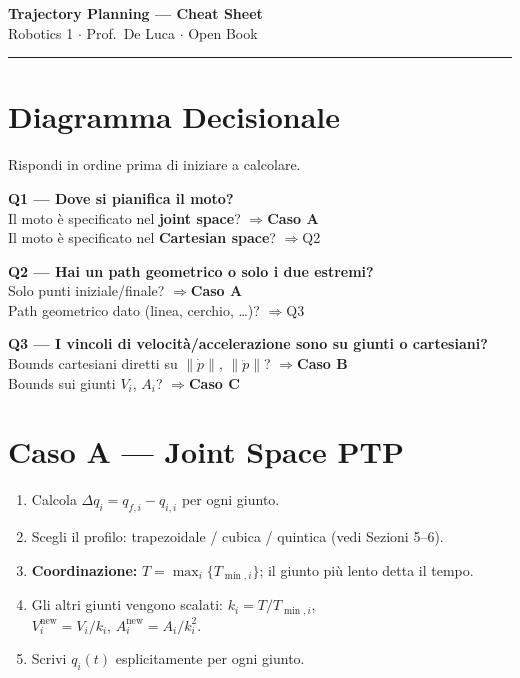 \documentclass[10pt,a4paper]{article}
\begin{document}
{\centering
  {\Large\bfseries Trajectory Planning --- Cheat Sheet}\\[3pt]
  {\normalsize Robotics 1 $\cdot$ Prof.\ De Luca $\cdot$ Open Book}\\[2pt]
  \hrule
  \vspace{6pt}
}

\section{Diagramma Decisionale}

Rispondi in ordine prima di iniziare a calcolare.

\begin{amberbox}
\textbf{Q1 --- Dove si pianifica il moto?}\\
Il moto \`e specificato nel \textbf{joint space}? \quad$\Rightarrow$\quad \textbf{Caso A}\\
Il moto \`e specificato nel \textbf{Cartesian space}? \quad$\Rightarrow$\quad Q2

\medskip
\textbf{Q2 --- Hai un path geometrico o solo i due estremi?}\\
Solo punti iniziale/finale? \quad$\Rightarrow$\quad \textbf{Caso A}\\
Path geometrico dato (linea, cerchio, \ldots)? \quad$\Rightarrow$\quad Q3

\medskip
\textbf{Q3 --- I vincoli di velocit\`a/accelerazione sono su giunti o cartesiani?}\\
Bounds cartesiani diretti su $\|\dot{p}\|$, $\|\ddot{p}\|$? \quad$\Rightarrow$\quad \textbf{Caso B}\\
Bounds sui giunti $V_i$, $A_i$? \quad$\Rightarrow$\quad \textbf{Caso C}
\end{amberbox}

\section{Caso A --- Joint Space PTP}

\begin{cyanbox}
\begin{enumerate}
  \item Calcola $\Delta q_i = q_{f,i} - q_{i,i}$ per ogni giunto.
  \item Scegli il profilo: trapezoidale / cubica / quintica (vedi Sezioni 5--6).
  \item \textbf{Coordinazione:} $T = \max_i\{T_{\min,i}\}$; il giunto pi\`u lento detta il tempo.
  \item Gli altri giunti vengono scalati: \quad $k_i = T / T_{\min,i}$,\\
        \hspace*{1cm} $V_i^{\text{new}} = V_i / k_i$, \quad $A_i^{\text{new}} = A_i / k_i^2$.
  \item Scrivi $q_i(t)$ esplicitamente per ogni giunto.
\end{enumerate}
\end{cyanbox}
\end{document}
